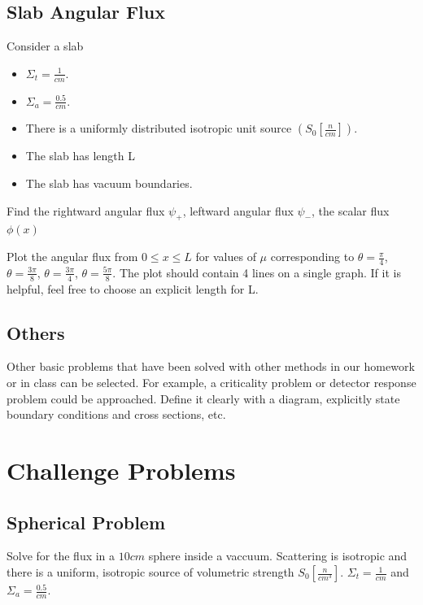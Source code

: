 \documentclass[12pts]{exam}
\begin{document}
        \subsection{Slab Angular Flux}
        Consider a slab
        \begin{itemize}
                \item $\Sigma_t = \frac{1}{cm}$.
                \item $\Sigma_a = \frac{0.5}{cm}$.
                \item There is a uniformly distributed isotropic unit source $\left(S_0\left[\frac{n}{cm}\right]\right)$.
                \item The slab has length L
                \item The slab has vacuum boundaries.
        \end{itemize}

        Find the rightward angular flux $\psi_+$, leftward angular
        flux $\psi_-$, the scalar flux $\phi(x)$

        Plot the angular flux from $0\le x \le L$ for values of $\mu$ corresponding to
        $\theta = \frac{\pi}{4}$,
        $\theta = \frac{3\pi}{8}$,
        $\theta = \frac{3\pi}{4}$,
        $\theta = \frac{5\pi}{8}$. The plot should contain 4 lines on a single
        graph. If it is helpful, feel free to choose an explicit length for L.

        \subsection{Others}
        Other basic problems that have been solved with other methods in our 
        homework or in class can be selected. For example, a criticality 
        problem or detector response problem could be approached. Define it 
        clearly with a diagram, explicitly state boundary conditions and cross 
        sections, etc.

        \section{Challenge Problems}\label{sec:challenge}
        \subsection{Spherical Problem} Solve for the flux in a $10cm$ sphere 
        inside a vaccuum. Scattering is isotropic and there is a uniform, 
        isotropic source of volumetric strength $S_0 
        \left[\frac{n}{cm^3}\right]$. $\Sigma_t = \frac{1}{cm}$ and  $\Sigma_a = \frac{0.5}{cm}$.
\end{document}
